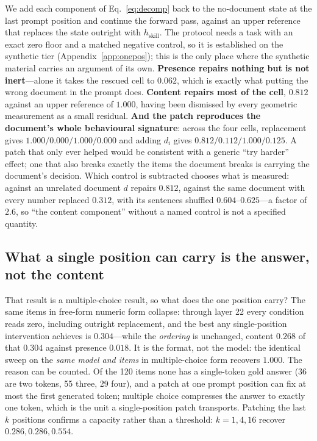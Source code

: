 \documentclass{article}
\newcommand{\dvec}{\ensuremath{d}}
\begin{document}
We add each component of Eq.~\ref{eq:decomp} back to the no-document state at
the last prompt position and continue the forward pass, against an upper
reference that replaces the state outright with $h_{\text{skill}}$. The protocol
needs a task with an exact zero floor and a matched negative control, so it is
established on the synthetic tier (Appendix~\ref{app:onepos}); this is the only
place where the synthetic material carries an argument of its own.
\textbf{Presence repairs nothing but is not inert}---alone it takes the rescued
cell to $0.062$, which is exactly what putting the wrong document in the prompt
does. \textbf{Content repairs most of the cell}, $0.812$ against an upper
reference of $1.000$, having been dismissed by every geometric measurement as a
small residual. \textbf{And the patch reproduces the document's whole
behavioural signature}: across the four cells, replacement gives
$1.000/0.000/1.000/0.000$ and adding $\dvec_i$ gives $0.812/0.112/1.000/0.125$.
A patch that only ever helped would be consistent with a generic ``try harder''
effect; one that also breaks exactly the items the document breaks is carrying
the document's decision. Which control is subtracted chooses what is measured:
against an unrelated document $\dvec$ repairs $0.812$, against the same document
with every number replaced $0.312$, with its sentences shuffled
$0.604$--$0.625$---a factor of $2.6$, so ``the content component'' without a
named control is not a specified quantity.

\subsection{What a single position can carry is the answer, not the content}
\label{sec:onepos}

That result is a multiple-choice result, so what does the one position carry?
The same items in free-form numeric form collapse: through layer 22 every
condition reads zero, including outright replacement, and the best any
single-position intervention achieves is $0.304$---while the \emph{ordering} is
unchanged, content $0.268$ of that $0.304$ against presence $0.018$. It is the
format, not the model: the identical sweep on the \emph{same model and items} in
multiple-choice form recovers $1.000$. The reason can be counted. Of the 120
items none has a single-token gold answer (36 are two tokens, 55 three, 29
four), and a patch at one prompt position can fix at most the first generated
token; multiple choice compresses the answer to exactly one token, which is the
unit a single-position patch transports. Patching the last $k$ positions
confirms a capacity rather than a threshold: $k=1,4,16$ recover
$0.286, 0.286, 0.554$.
\end{document}
